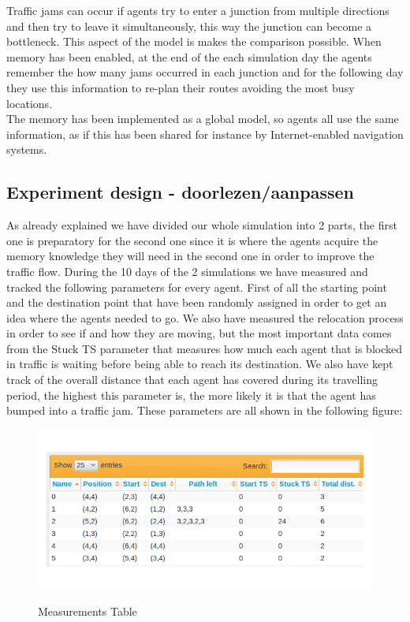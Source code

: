 \documentclass[a4paper,hidelinks]{article}
\begin{document}
Traffic jams can occur if agents try to enter a junction from multiple directions and then try to leave it simultaneously, this way the junction can become a bottleneck. This aspect of the model is makes the comparison possible. When memory has been enabled, at the end of the each simulation day the agents remember the how many jams occurred in each junction and for the following day they use this information to re-plan their routes avoiding the most busy locations. \\
The memory has been implemented as a global model, so agents all use the same information, as if this has been shared for instance by Internet-enabled navigation systems.

\subsection{Experiment design - doorlezen/aanpassen}

As already explained we have divided our whole simulation into 2 parts, the first one is preparatory for the second one since it is where the agents acquire the memory knowledge they will need in the second one in order to improve the traffic flow. During the 10 days of the 2 simulations we have measured and tracked the following parameters for every agent. First of all the starting point and the destination point that have been randomly assigned in order to get an idea where the agents needed to go. We also have measured the relocation process in order to see if and how they are moving, but the most important data comes from the Stuck TS parameter that measures how much each agent that is blocked in traffic is waiting before being able to reach its destination. We also have kept track of the overall distance that each agent has covered during its travelling period, the highest this parameter is, the more likely it is that the agent has bumped into a traffic jam. These parameters are all shown in the following figure:

\begin{figure}[ht!]
\centering
\includegraphics[width = 1.0\linewidth]{data}
\label{fig:measurements}
\caption{Measurements Table \label{overflow}}
\end{figure} 
\end{document}

